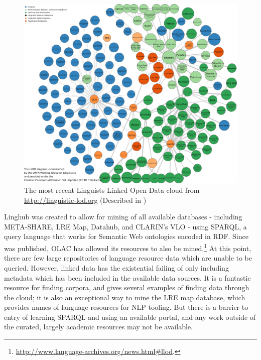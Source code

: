 \begin{figure}
 \centering
 \includegraphics[width=1\textwidth]{img/llod.png}
 \caption{The most recent Linguists Linked Open Data cloud from \href{http://linguistic-lod.org}{http://linguistic-lod.org} (Described in \citet{chiarcos2012linking})}
 \label{fig:llod}
\end{figure}

Linghub \citep{mccrae2015linghub, mccrae2015reconciling} was created to allow for mining of all available databases - including META-SHARE, LRE Map, Datahub, and CLARIN's VLO - using SPARQL, a query language that works for Semantic Web ontologies encoded in RDF. Since \citet{mccrae2015linghub} was published, OLAC has allowed its resources to also be mined.\footnote{\href{http://www.language-archives.org/news.html\#llod}{http://www.language-archives.org/news.html\#llod}. } At this point, there are few large repositories of language resource data which are unable to be queried. However, linked data has the existential failing of only including metadata which has been included in the available data sources. It is a fantastic resource for finding corpora, and \citet{mccrae2015linghub} gives several examples of finding data through the cloud;  it is also an exceptional way to mine the LRE map database, which provides names of language resources for NLP tooling. But there is a barrier to entry of learning SPARQL and using an available portal, and any work outside of the curated, largely academic resources may not be available.

